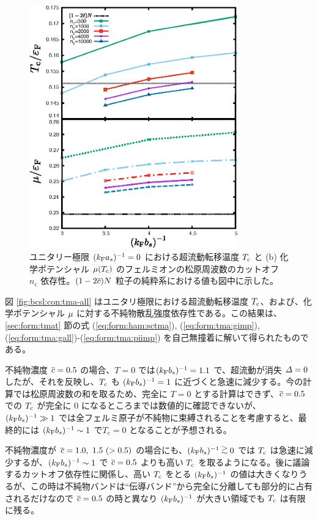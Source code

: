 \begin{figure}[t]
\centering
\includegraphics[width=90mm]{eps/tma-cpt-cut.eps}
\caption{ユニタリー極限 $(k_{\text{F}} a_s)^{-1}=0$ における超流動転移温度 $T_{\text{c}}$ と (b) 化学ポテンシャル $\mu(T_{\text{c}})$ のフェルミオンの松原周波数のカットオフ $n_{\text{c}}$ 依存性。$(1-2\overline{c})N$ 粒子の純粋系における値も図中に示した。}
\label{fig:bcsl:con:tma-cut}
\end{figure}



図 \ref{fig:bcsl:con:tma-all} はユニタリ極限における超流動転移温度 $T_{\text{c}}$、および、化学ポテンシャル $\mu$ に対する不純物散乱強度依存性である。この結果は、\ref{sec:form:tmat} 節の式 (\ref{eq:form:ham:sctma}), (\ref{eq:form:tma:gimp}), (\ref{eq:form:tma:gall})-(\ref{eq:form:tma:piimp}) を自己無撞着に解いて得られたものである。

不純物濃度 $\overline{c}=0.5$ の場合、$T=0$ では$(k_{\text{F}} b_s)^{-1}=1.1$ で、超流動が消失 $\varDelta=0$ したが、それを反映し、$T_{\text{c}}$ も $(k_{\text{F}} b_s)^{-1}=1$ に近づくと急速に減少する。今の計算では松原周波数の和を取るため、完全に $T=0$ とする計算はできず、$\overline{c}=0.5$ での $T_{\text{c}}$ が完全に 0 になるところまでは数値的に確認できないが、 $(k_{\text{F}} b_s)^{-1}\gg1$ では全フェルミ原子が不純物に束縛されることを考慮すると、最終的には $(k_{\text{F}} b_s)^{-1}\sim1$ で$T_{\text{c}}=0$ となることが予想される。

不純物濃度が $\lc=1.0,\ 1.5\  (>0.5)$ の場合にも、$\bskfi\gtsim 0$ では $T_{\text{c}}$ は急速に減少するが、$(k_{\text{F}} b_s)^{-1} \sim 1$ で $\overline{c}=0.5$ よりも高い $T_{\text{c}}$ を取るようになる。後に議論するカットオフ依存性に関係し、高い $T_{\text{c}}$ をとる $(k_{\text{F}} b_s)^{-1}$ の値は大きくなりうるが、この時は不純物バンドは“伝導バンド”から完全に分離しても部分的に占有されるだけなので $\overline{c}=0.5$ の時と異なり $(k_{\text{F}} b_s)^{-1}$ が大きい領域でも $T_{\text{c}}$ は有限に残る。

